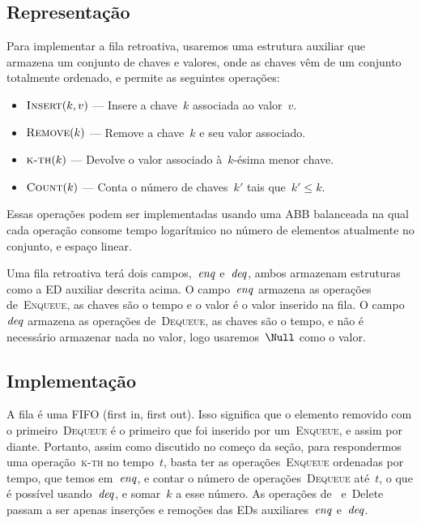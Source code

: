 \documentclass[quali.tex]{subfile}
\begin{document}
\subsection{Representação}

Para implementar a fila retroativa, usaremos uma estrutura auxiliar que armazena um conjunto de chaves e valores, onde as chaves vêm de um conjunto totalmente ordenado, e permite as seguintes operações:

\begin{itemize}
	\item $\Call{Insert}{k, v}$ --- Insere a chave~$k$ associada ao valor~$v$.
	\item $\Call{Remove}{k}$ --- Remove a chave~$k$ e seu valor associado.
	\item $\Call{k-th}{k}$ --- Devolve o valor associado à~$k$-ésima menor chave. %
	\item $\Call{Count}{k}$ --- Conta o número de chaves~$k'$ tais que~$k' \leq k$.
\end{itemize}

Essas operações podem ser implementadas usando uma ABB balanceada na qual cada operação consome tempo logarítmico no número de elementos atualmente no conjunto, e espaço linear.

\newcommand{\deqs}{\V{deq}}
\newcommand{\enqs}{\V{enq}}

Uma fila retroativa terá dois campos,~$\enqs$ e~$\deqs$, ambos armazenam estruturas como a ED auxiliar descrita acima. O campo~$\enqs$ armazena as operações de~\textsc{Enqueue}, as chaves são o tempo e o valor é o valor inserido na fila. O campo~$\deqs$ armazena as operações de~\textsc{Dequeue}, as chaves são o tempo, e não é necessário armazenar nada no valor, logo usaremos~$\Null$ como o valor.

\subsection{Implementação}

A fila é uma FIFO (first in, first out). Isso significa que o elemento removido com o primeiro~\textsc{Dequeue} é o primeiro que foi inserido por um~\textsc{Enqueue}, e assim por diante. Portanto, assim como discutido no começo da seção, para respondermos uma operação~\textsc{k-th} no tempo~$t$, basta ter as operações~\textsc{Enqueue} ordenadas por tempo, que temos em~$\enqs$, e contar o número de operações~\textsc{Dequeue} até~$t$, o que é possível usando~$\deqs$, e somar~$k$ a esse número. As operações de~ e~Delete passam a ser apenas inserções e remoções das EDs auxiliares~$\enqs$ e~$\deqs$.
\end{document}
